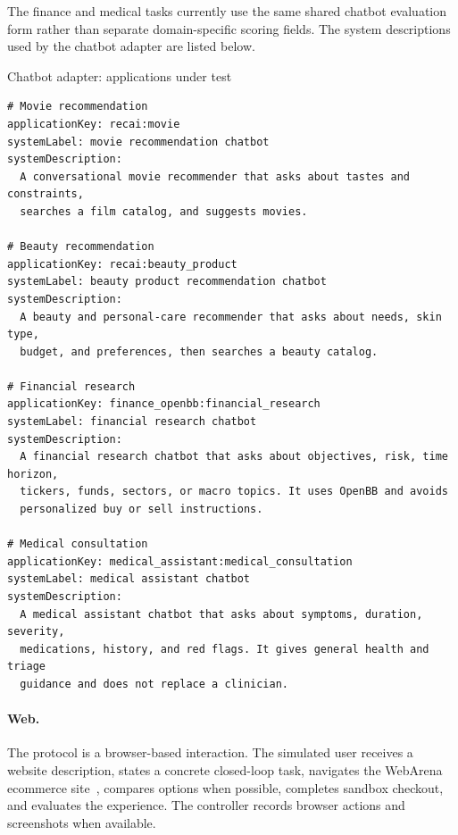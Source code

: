 The finance and medical tasks currently use the same shared chatbot evaluation
form rather than separate domain-specific scoring fields. The system descriptions
used by the chatbot adapter are listed below.

\begin{promptbox}[label={box:chat-apps}]{Chatbot adapter: applications under test}
\begin{lstlisting}
# Movie recommendation
applicationKey: recai:movie
systemLabel: movie recommendation chatbot
systemDescription:
  A conversational movie recommender that asks about tastes and constraints,
  searches a film catalog, and suggests movies.

# Beauty recommendation
applicationKey: recai:beauty_product
systemLabel: beauty product recommendation chatbot
systemDescription:
  A beauty and personal-care recommender that asks about needs, skin type,
  budget, and preferences, then searches a beauty catalog.

# Financial research
applicationKey: finance_openbb:financial_research
systemLabel: financial research chatbot
systemDescription:
  A financial research chatbot that asks about objectives, risk, time horizon,
  tickers, funds, sectors, or macro topics. It uses OpenBB and avoids
  personalized buy or sell instructions.

# Medical consultation
applicationKey: medical_assistant:medical_consultation
systemLabel: medical assistant chatbot
systemDescription:
  A medical assistant chatbot that asks about symptoms, duration, severity,
  medications, history, and red flags. It gives general health and triage
  guidance and does not replace a clinician.
\end{lstlisting}
\end{promptbox}

\paragraph{Web.}
The protocol is a browser-based interaction. The simulated user receives a
website description, states a concrete closed-loop task, navigates the WebArena
ecommerce site~\citep{zhou2024webarena}, compares options when possible,
completes sandbox checkout, and evaluates the experience. The controller records
browser actions and screenshots when available.

